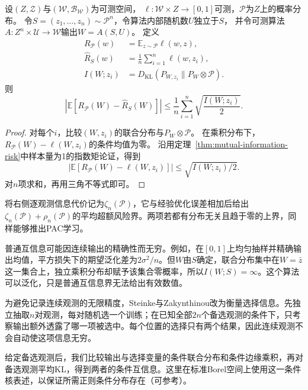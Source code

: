 \begin{theorem}[逐观测互信息的期望风险界]
\label{thm:individual-information-risk}
设$(Z,\mathcal Z)$与$(\mathcal W,\mathcal B_{\mathcal W})$为可测空间，
$\ell:\mathcal W\times Z\to[0,1]$可测，$\mathcal P$为$Z$上的概率分布。
令$S=(z_1,\ldots,z_n)\sim\mathcal P^n$，令算法内部随机数$U$独立于$S$，
并令可测算法$A:Z^n\times\mathcal U\to\mathcal W$输出$W=A(S,U)$。
定义
\[
\begin{aligned}
 R_{\mathcal P}(w)
 &=\mathbb E_{z\sim\mathcal P}\ell(w,z),\\
 \hat R_S(w)
 &=\frac1n\sum_{i=1}^n\ell(w,z_i),\\
 I(W;z_i)
 &=D_{\mathrm{KL}}(P_{W,z_i}\|P_W\otimes\mathcal P).
\end{aligned}
\]
则
\[
 \left|\mathbb E[R_{\mathcal P}(W)-\hat R_S(W)]\right|
 \leq\frac1n\sum_{i=1}^n\sqrt{\frac{I(W;z_i)}2}.
\]
\end{theorem}
\begin{proof}
对每个$i$，比较$(W,z_i)$的联合分布与$P_W\otimes\mathcal P$。
在乘积分布下，$R_{\mathcal P}(W)-\ell(W,z_i)$的条件均值为零。
沿用定理~\ref{thm:mutual-information-risk}中样本量为1的指数矩论证，得到
\[
 \left|\mathbb E[R_{\mathcal P}(W)-\ell(W,z_i)]\right|
 \leq\sqrt{I(W;z_i)/2}.
\]
对$n$项求和，再用三角不等式即可。
\end{proof}

将右侧逐观测信息代价记为$\zeta_n(\mathcal P)$，它与经验优化误差相加后给出$\zeta_n(\mathcal P)+\rho_n(\mathcal P)$的平均超额风险界。两项若都有分布无关且趋于零的上界，同样能够推出PAC学习。

普通互信息可能因连续输出的精确性而无穷。例如，在$[0,1]$上均匀抽样并精确输出均值，平方损失下的期望泛化差为$2\sigma^2/n$。但$W$由$S$确定，联合分布集中在$W=\bar z$这一集合上，独立乘积分布却赋予该集合零概率，所以$I(W;S)=\infty$。这个算法可以泛化，只是普通互信息界无法给出有效数值。

为避免记录连续观测的无限精度，Steinke与Zakynthinou改为衡量选择信息。先独立抽取$n$对观测，每对随机选一个训练；在已知全部$2n$个备选观测的条件下，只考察输出额外透露了哪一项被选中。每个位置的选择只有两个结果，因此连续观测不会自动使这项信息无穷。

\label{def:stability-conditional-information}
给定备选观测后，我们比较输出与选择变量的条件联合分布和条件边缘乘积，再对备选观测平均KL，得到两者的条件互信息。这里在标准Borel空间上使用这一条件核表述，以保证所需正则条件分布存在（可参考）。

